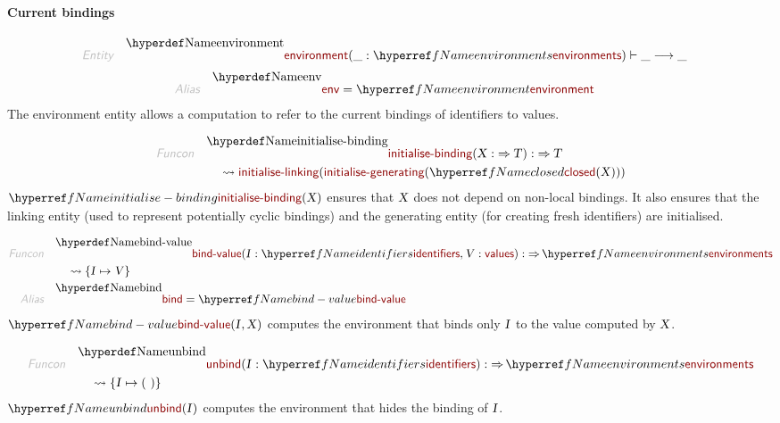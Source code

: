 \paragraph{Current bindings}\hypertarget{current-bindings}{}\label{current-bindings}

\begin{align*}
  \KEY{Entity} \quad
  & \NAMEDECL{environment}(\_ : \NAMEREF{environments}) \vdash \_ \TRANS  \_
\end{align*}
\begin{align*}
  \KEY{Alias} \quad
  & \NAMEDECL{env} = \NAMEREF{environment}
\end{align*}
The environment entity allows a computation to refer to the current bindings
  of identifiers to values.

\begin{align*}
  \KEY{Funcon} \quad
  & \NAMEDECL{initialise-binding}(
                       \VAR{X} :  \TO \VAR{T}) 
    :  \TO \VAR{T} \\&\quad
    \leadsto \NAMEHYPER{../.}{Linking}{initialise-linking}
               (  \NAMEHYPER{../.}{Generating}{initialise-generating}
                       (  \NAMEREF{closed}
                               (  \VAR{X} ) ) )
\end{align*}
$\SHADE{\NAMEREF{initialise-binding}
           (  \VAR{X} )}$ ensures that $\SHADE{\VAR{X}}$ does not depend on non-local bindings.
  It also ensures that the linking entity (used to represent potentially cyclic
  bindings) and the generating entity (for creating fresh identifiers) are 
  initialised.

\begin{align*}
  \KEY{Funcon} \quad
  & \NAMEDECL{bind-value}(
                       \VAR{I} : \NAMEREF{identifiers}, \VAR{V} : \NAMEHYPER{../../../Values}{Value-Types}{values}) 
    :  \TO \NAMEREF{environments} \\&\quad
    \leadsto \{ \VAR{I} \mapsto 
                  \VAR{V} \}
\\
  \KEY{Alias} \quad
  & \NAMEDECL{bind} = \NAMEREF{bind-value}
\end{align*}
$\SHADE{\NAMEREF{bind-value}
           (  \VAR{I}, 
                  \VAR{X} )}$ computes the environment that binds only $\SHADE{\VAR{I}}$ to the value
  computed by $\SHADE{\VAR{X}}$.

\begin{align*}
  \KEY{Funcon} \quad
  & \NAMEDECL{unbind}(
                       \VAR{I} : \NAMEREF{identifiers}) 
    :  \TO \NAMEREF{environments} \\&\quad
    \leadsto \{ \VAR{I} \mapsto 
                  (   \  ) \}
\end{align*}
$\SHADE{\NAMEREF{unbind}
           (  \VAR{I} )}$ computes the environment that hides the binding of $\SHADE{\VAR{I}}$.

